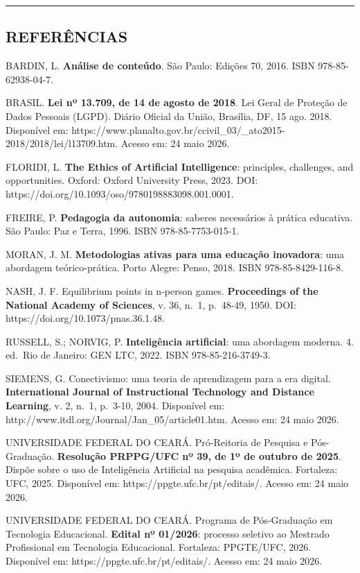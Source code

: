 \documentclass[
  brazilian,
  12pt,
]{article}
\begin{document}
\begin{center}\rule{0.5\linewidth}{0.5pt}\end{center}

\subsection{REFERÊNCIAS}\label{referuxeancias}

BARDIN, L. \textbf{Análise de conteúdo}. São Paulo: Edições 70, 2016.
ISBN 978-85-62938-04-7.

BRASIL. \textbf{Lei nº 13.709, de 14 de agosto de 2018}. Lei Geral de
Proteção de Dados Pessoais (LGPD). Diário Oficial da União, Brasília,
DF, 15 ago. 2018. Disponível em:
https://www.planalto.gov.br/ccivil\_03/\_ato2015-2018/2018/lei/l13709.htm.
Acesso em: 24 maio 2026.

FLORIDI, L. \textbf{The Ethics of Artificial Intelligence}: principles,
challenges, and opportunities. Oxford: Oxford University Press, 2023.
DOI: https://doi.org/10.1093/oso/9780198883098.001.0001.

FREIRE, P. \textbf{Pedagogia da autonomia}: saberes necessários à
prática educativa. São Paulo: Paz e Terra, 1996. ISBN 978-85-7753-015-1.

MORAN, J. M. \textbf{Metodologias ativas para uma educação inovadora}:
uma abordagem teórico-prática. Porto Alegre: Penso, 2018. ISBN
978-85-8429-116-8.

NASH, J. F. Equilibrium points in n-person games. \textbf{Proceedings of
the National Academy of Sciences}, v. 36, n.~1, p.~48-49, 1950. DOI:
https://doi.org/10.1073/pnas.36.1.48.

RUSSELL, S.; NORVIG, P. \textbf{Inteligência artificial}: uma abordagem
moderna. 4. ed.~Rio de Janeiro: GEN LTC, 2022. ISBN 978-85-216-3749-3.

SIEMENS, G. Conectivismo: uma teoria de aprendizagem para a era digital.
\textbf{International Journal of Instructional Technology and Distance
Learning}, v. 2, n.~1, p.~3-10, 2004. Disponível em:
http://www.itdl.org/Journal/Jan\_05/article01.htm. Acesso em: 24 maio
2026.

UNIVERSIDADE FEDERAL DO CEARÁ. Pró-Reitoria de Pesquisa e Pós-Graduação.
\textbf{Resolução PRPPG/UFC nº 39, de 1º de outubro de 2025}. Dispõe
sobre o uso de Inteligência Artificial na pesquisa acadêmica. Fortaleza:
UFC, 2025. Disponível em: https://ppgte.ufc.br/pt/editais/. Acesso em:
24 maio 2026.

UNIVERSIDADE FEDERAL DO CEARÁ. Programa de Pós-Graduação em Tecnologia
Educacional. \textbf{Edital nº 01/2026}: processo seletivo ao Mestrado
Profissional em Tecnologia Educacional. Fortaleza: PPGTE/UFC, 2026.
Disponível em: https://ppgte.ufc.br/pt/editais/. Acesso em: 24 maio
2026.
\end{document}

